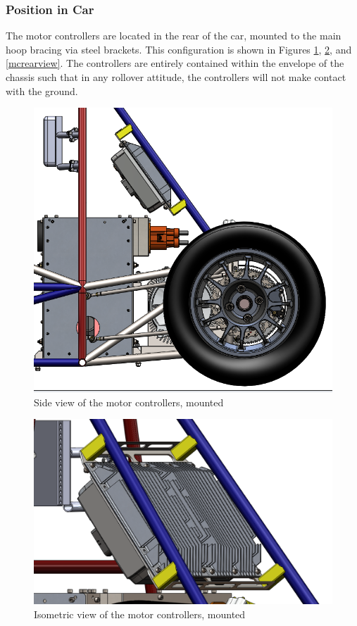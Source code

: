 \documentclass{article}
\begin{document}
        \subsubsection{Position in Car}
        
            The motor controllers are located in the rear of the car, mounted to the main hoop bracing via steel brackets. This configuration is shown in Figures \ref{mcsideview}, \ref{mciso}, and \ref{mcrearview}. The controllers are entirely contained within the envelope of the chassis such that in any rollover attitude, the controllers will not make contact with the ground.

            \begin{figure}[H]
                \centering
                \includegraphics[width = 0.6 \textwidth]{motorcontroller_sideview}
                \caption{Side view of the motor controllers, mounted}
                \label{mcsideview}
            \end{figure}
            
            \begin{figure}[H]
                \centering
                \includegraphics[width = 0.6 \textwidth]{motorcontroller_isoview}
                \caption{Isometric view of the motor controllers, mounted}
                \label{mciso}
            \end{figure}
            
\end{document}
